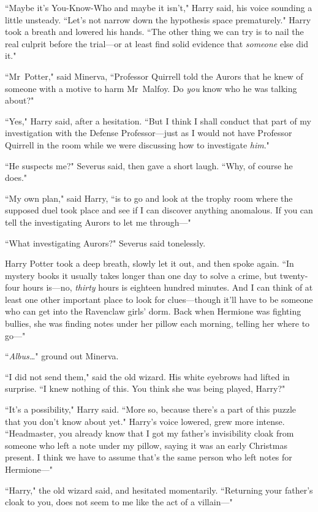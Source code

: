 ``Maybe it's You-Know-Who and maybe it isn't," Harry said, his voice sounding a little unsteady. ``Let's not narrow down the hypothesis space prematurely." Harry took a breath and lowered his hands. ``The other thing we can try is to nail the real culprit before the trial—or at least find solid evidence that \emph{someone} else did it."

``Mr~Potter," said Minerva, ``Professor Quirrell told the Aurors that he knew of someone with a motive to harm Mr~Malfoy. Do \emph{you} know who he was talking about?"

``Yes," Harry said, after a hesitation. ``But I think I shall conduct that part of my investigation with the Defense Professor—just as I would not have Professor Quirrell in the room while we were discussing how to investigate \emph{him}."

``He suspects me?" Severus said, then gave a short laugh. ``Why, of course he does."

``My own plan," said Harry, ``is to go and look at the trophy room where the supposed duel took place and see if I can discover anything anomalous. If you can tell the investigating Aurors to let me through—"

``What investigating Aurors?" Severus said tonelessly.

Harry Potter took a deep breath, slowly let it out, and then spoke again. ``In mystery books it usually takes longer than one day to solve a crime, but twenty-four hours is—no, \emph{thirty} hours is eighteen hundred minutes. And I can think of at least one other important place to look for clues—though it'll have to be someone who can get into the Ravenclaw girls' dorm. Back when Hermione was fighting bullies, she was finding notes under her pillow each morning, telling her where to go—"

``\emph{Albus{\ldots}}" ground out Minerva.

``I did not send them," said the old wizard. His white eyebrows had lifted in surprise. ``I knew nothing of this. You think she was being played, Harry?"

``It's a possibility," Harry said. ``More so, because there's a part of this puzzle that you don't know about yet." Harry's voice lowered, grew more intense. ``Headmaster, you already know that I got my father's invisibility cloak from someone who left a note under my pillow, saying it was an early Christmas present. I think we have to assume that's the same person who left notes for Hermione—"

``Harry," the old wizard said, and hesitated momentarily. ``Returning your father's cloak to you, does not seem to me like the act of a villain—"

